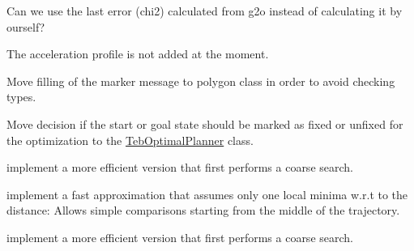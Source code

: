 \begin{DoxyRefList}
Can we use the last error (chi2) calculated from g2o instead of calculating it by ourself?  
\item[全局 \mbox{\hyperlink{classteb__local__planner_1_1TebOptimalPlanner_a6853f051df0dfde21f1e6a2c4e15974c}{teb\+\_\+local\+\_\+planner\+::Teb\+Optimal\+Planner\+::get\+Full\+Trajectory}} (std\+::vector$<$ Trajectory\+Point\+Msg $>$ \&trajectory) const]\label{todo__todo000007}%
%
The acceleration profile is not added at the moment.  
\item[全局 \mbox{\hyperlink{classteb__local__planner_1_1TebVisualization_a4265504ad80d52ea050dc3c60f267bff}{teb\+\_\+local\+\_\+planner\+::Teb\+Visualization\+::publish\+Obstacles}} (const Obst\+Container \&obstacles) const]\label{todo__todo000017}%
%
Move filling of the marker message to polygon class in order to avoid checking types.  
\item[类 \mbox{\hyperlink{classteb__local__planner_1_1TimedElasticBand}{teb\+\_\+local\+\_\+planner\+::Timed\+Elastic\+Band}} ]\label{todo__todo000012}%
%
Move decision if the start or goal state should be marked as fixed or unfixed for the optimization to the \mbox{\hyperlink{classteb__local__planner_1_1TebOptimalPlanner}{Teb\+Optimal\+Planner}} class.  
\item[全局 \mbox{\hyperlink{classteb__local__planner_1_1TimedElasticBand_aaae3fcdccc1f539b16ef6d4a3cab0ae7}{teb\+\_\+local\+\_\+planner\+::Timed\+Elastic\+Band\+::find\+Closest\+Trajectory\+Pose}} (const Eigen\+::\+Ref$<$ const Eigen\+::\+Vector2d $>$ \&ref\+\_\+point, double $\ast$distance=NULL, int begin\+\_\+idx=0) const]\label{todo__todo000014}%
%
implement a more efficient version that first performs a coarse search. 

implement a fast approximation that assumes only one local minima w.\+r.\+t to the distance\+: Allows simple comparisons starting from the middle of the trajectory. 
\item[全局 \mbox{\hyperlink{classteb__local__planner_1_1TimedElasticBand_a21b422124633a6952e74fe14062929f1}{teb\+\_\+local\+\_\+planner\+::Timed\+Elastic\+Band\+::find\+Closest\+Trajectory\+Pose}} (const Eigen\+::\+Ref$<$ const Eigen\+::\+Vector2d $>$ \&ref\+\_\+line\+\_\+start, const Eigen\+::\+Ref$<$ const Eigen\+::\+Vector2d $>$ \&ref\+\_\+line\+\_\+end, double $\ast$distance=NULL) const]\label{todo__todo000015}%
%
implement a more efficient version that first performs a coarse search. 


\end{DoxyRefList}

